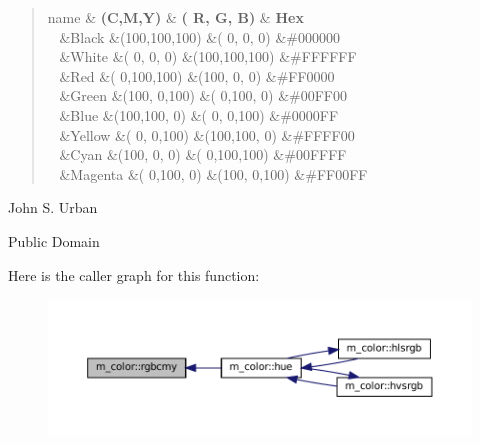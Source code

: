 \begin{DoxyDescription}
\begin{quote}
\begin{longtabu}
{name  }&\textbf{ (C,M,Y) }&\textbf{ ( R, G, B) }&\textbf{ Hex  }\\
\endhead
~ &Black &(100,100,100) &( 0, 0, 0) &\#000000  \\
~ &White &( 0, 0, 0) &(100,100,100) &\#\+F\+F\+F\+F\+FF  \\
~ &Red &( 0,100,100) &(100, 0, 0) &\#\+F\+F0000  \\
~ &Green &(100, 0,100) &( 0,100, 0) &\#00\+F\+F00  \\
~ &Blue &(100,100, 0) &( 0, 0,100) &\#0000\+FF  \\
~ &Yellow &( 0, 0,100) &(100,100, 0) &\#\+F\+F\+F\+F00  \\
~ &Cyan &(100, 0, 0) &( 0,100,100) &\#00\+F\+F\+FF  \\
~ &Magenta &( 0,100, 0) &(100, 0,100) &\#\+F\+F00\+FF  \\
\end{longtabu}
\end{quote}





\item[A\+U\+T\+H\+OR ]

John S. Urban




\item[L\+I\+C\+E\+N\+SE ]

Public Domain




\end{DoxyDescription}Here is the caller graph for this function\+:
\nopagebreak
\begin{figure}[H]
\begin{center}
\leavevmode
\includegraphics[width=350pt]{namespacem__color_ad6e8505eef5add299c4475d289f3c5c5_icgraph}
\end{center}
\end{figure}
\mbox{\label{namespacem__color_a1dd027cbe65112af243d26195b1fc49a}} 
